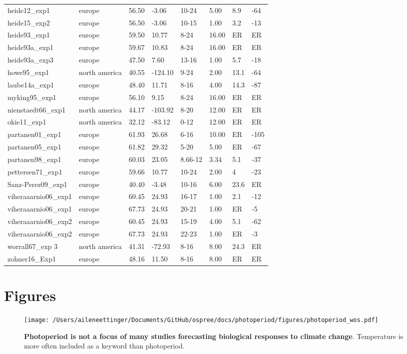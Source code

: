 \documentclass{article}
\begin{document}
\begin{table}[ht]
\begin{tabular}{|p{}|p{}|p{}|p{}|p{}|p{}|p{}|p{}|}
  heide12\_exp1 & europe & 56.50 & -3.06 & 10-24 & 5.00 & 8.9 & -64 \\ 
  heide15\_exp2 & europe & 56.50 & -3.06 & 10-15 & 1.00 & 3.2 & -13 \\ 
  heide93\_exp1 & europe & 59.50 & 10.77 & 8-24 & 16.00 & ER & ER \\ 
  heide93a\_exp1 & europe & 59.67 & 10.83 & 8-24 & 16.00 & ER & ER \\ 
  heide93a\_exp3 & europe & 47.50 & 7.60 & 13-16 & 1.00 & 5.7 & -18 \\ 
  howe95\_exp1 & north america & 40.55 & -124.10 & 9-24 & 2.00 & 13.1 & -64 \\ 
  laube14a\_exp1 & europe & 48.40 & 11.71 & 8-16 & 4.00 & 14.3 & -87 \\ 
  myking95\_exp1 & europe & 56.10 & 9.15 & 8-24 & 16.00 & ER & ER \\ 
  nienstaedt66\_exp1 & north america & 44.17 & -103.92 & 8-20 & 12.00 & ER & ER \\ 
  okie11\_exp1 & north america & 32.12 & -83.12 & 0-12 & 12.00 & ER & ER \\ 
  partanen01\_exp1 & europe & 61.93 & 26.68 & 6-16 & 10.00 & ER & -105 \\ 
  partanen05\_exp1 & europe & 61.82 & 29.32 & 5-20 & 5.00 & ER & -67 \\ 
  partanen98\_exp1 & europe & 60.03 & 23.05 & 8.66-12 & 3.34 & 5.1 & -37 \\ 
  pettersen71\_exp1 & europe & 59.66 & 10.77 & 10-24 & 2.00 & 4 & -23 \\ 
  Sanz-Perez09\_exp1 & europe & 40.40 & -3.48 & 10-16 & 6.00 & 23.6 & ER \\ 
  viheraaarnio06\_exp1 & europe & 60.45 & 24.93 & 16-17 & 1.00 & 2.1 & -12 \\ 
  viheraaarnio06\_exp1 & europe & 67.73 & 24.93 & 20-21 & 1.00 & ER & -5 \\ 
  viheraaarnio06\_exp2 & europe & 60.45 & 24.93 & 15-19 & 4.00 & 5.1 & -62 \\ 
  viheraaarnio06\_exp2 & europe & 67.73 & 24.93 & 22-23 & 1.00 & ER & -3 \\ 
  worrall67\_exp 3 & north america & 41.31 & -72.93 & 8-16 & 8.00 & 24.3 & ER \\ 
  zohner16\_Exp1 & europe & 48.16 & 11.50 & 8-16 & 8.00 & ER & ER \\ 
   \hline
\end{tabular}
\end{table}\clearpage
\section* {Figures}
\begin{figure}[p]
\centering
\texttt{[image: /Users/aileneettinger/Documents/GitHub/ospree/docs/photoperiod/figures/photoperiod\_wos.pdf]} %
\caption{\textbf{Photoperiod is not a focus of many studies forecasting biological responses to climate change}. Temperature is more often included as a keyword than photoperiod.}
 \label{fig:wos}%
 \end{figure}
 
\end{document}

